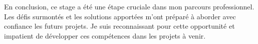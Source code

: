 En conclusion, ce stage a été une étape cruciale dans mon parcours professionnel. Les défis surmontés et les solutions apportées m'ont préparé à aborder avec confiance les futurs projets. Je suis reconnaissant pour cette opportunité et impatient de développer ces compétences dans les projets à venir.



